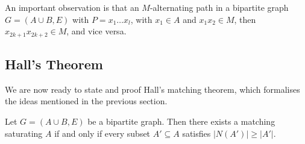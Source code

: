An important observation is that an $M$-alternating path in a bipartite graph $G = (A\cup B, E)$ with $P = x_1 \dots x_l$, with $x_1 \in A$ and $x_1 x_2 \in M$, then $x_{2k + 1}x_{2k + 2} \in M$, and vice versa.

\subsection{Hall's Theorem}

We are now ready to state and proof Hall's matching theorem, which formalises the ideas mentioned in the previous section.

\begin{theorem}
	Let $G = (A \cup B, E)$ be a bipartite graph. Then there exists a matching saturating $A$ if and only if every subset $A' \subseteq A$ satisfies $|N(A')| \geq |A'|$.
\end{theorem}
